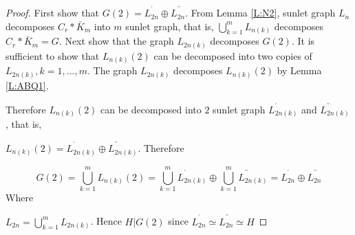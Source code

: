 \documentclass[12pt]{report}
\begin{document}
\begin{proof}
First show that $G\left( 2\right) =L_{2n}^{^{\prime }}\oplus
L_{2n}^{^{\prime \prime }}$. From Lemma \ref{L:N2}, sunlet graph $L_{n}$ decomposes $C_{r}*\bar{K%
}_{m}$ into $m$ sunlet graph, that is, $\bigcup_{k=1}^{m}L_{n(k)}$
decomposes $C_{r}*\bar{K}_{m}=G$. Next show that the graph $L_{2n(k)}$ decomposes $%
G\left( 2\right) $. It is sufficient to show that $L_{n(k)}\left(
2\right) $ can be decomposed into two copies of
$L_{2n(k)},k=1,...,m$. The graph $L_{2n(k)}$ decomposes
$L_{n(k)}(2)$ by Lemma \ref{L:ABQ1}.

Therefore $L_{n(k)}\left( 2\right) $ can be
decomposed into $2$ sunlet graph $L_{2n(k)}^{^{\prime }}$ and $%
L_{2n(k)}^{^{\prime \prime }}$, that is,

$L_{n(k)}\left( 2\right) =L_{2n(k)}^{^{\prime }}\oplus
L_{2n(k)}^{^{\prime \prime }}$. Therefore

$$G\left( 2\right) =\bigcup_{k=1}^{m}L_{n(k)}\left( 2\right)
=\bigcup_{k=1}^{m}L_{2n(k)}^{^{\prime }}\oplus
\bigcup_{k=1}^{m}L_{2n(k)}^{^{\prime \prime }}=L_{2n}^{^{\prime }}\oplus
L_{2n}^{^{\prime \prime }}$$ Where

$L_{2n}=\bigcup_{k=1}^{m}L_{2n(k)}$. Hence $H|G\left( 2\right) $ since $%
L_{2n}^{^{\prime }}\simeq L_{2n}^{^{\prime \prime }}\simeq H$
\end{proof}
\end{document}
